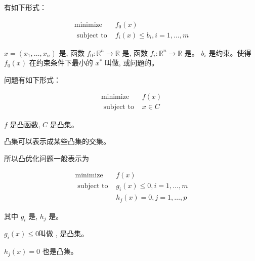 \begin{definition}[优化问题]
    有如下形式：

    $$
\begin{array}{ll}
\operatorname{minimize} & f_{0}(x) \\
\text { subject to } & f_{i}(x) \leqslant b_{i}, i=1, \ldots, m
\end{array}
$$

$ x=\left(x_{1}, \ldots, x_{n}\right) $ 是, 函数 $ f_{0}: \mathbb{R}^{n} \rightarrow \mathbb{R} $ 是, 函数 $ f_{i}: \mathbb{R}^{n} \rightarrow \mathbb{R} $ 是。 $ b_{i} $ 是约束。使得 $ f_{0}(x) $ 在约束条件下最小的 $ x^{*} $ 叫做, 或问题的。
\end{definition}

\begin{definition}[凸优化]
    问题有如下形式：

    $$
    \begin{array}{ll}
    \operatorname{minimize} & f(x) \\
    \text { subject to } & x \in C
    \end{array}
    $$
    
    $ f $ 是凸函数, $ C $ 是凸集。
\end{definition}

\begin{corollary}
    凸集可以表示成某些凸集的交集。
\end{corollary}

所以凸优化问题一般表示为

\begin{definition}[凸优化问题]
    \label{def:convex-problem}

    $$
    \begin{array}{ll}
    \operatorname{minimize} & f(x) \\
    \text { subject to } & g_{i}(x) \leqslant 0, i=1, \ldots, m \\
    & h_{j}(x)=0, j=1, \ldots, p
    \end{array}
    $$

    其中 $ g_{i} $ 是, $ h_{j} $ 是。 
\end{definition}

$ g_{i}(x) \leqslant 0 $叫做 , 是凸集。

\begin{theorem}
    $ h_{j}(x)=0 $ 也是凸集。
\end{theorem}


